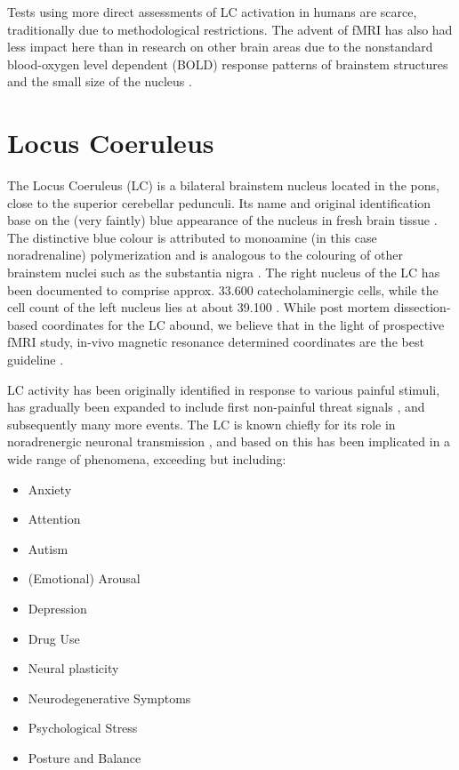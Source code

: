 	Tests using more direct assessments of LC activation in humans are scarce, traditionally due to methodological restrictions.
	The advent of fMRI has also had less impact here than in research on other brain areas due to the nonstandard blood-oxygen level dependent (BOLD) response patterns of brainstem structures and the small size of the nucleus \cite{Astafiev2010}.
	
    \section{Locus Coeruleus}\label{sec:b_lc}
	The Locus Coeruleus (LC) is a bilateral brainstem nucleus located in the pons, close to the superior cerebellar pedunculi.
	Its name and original identification base on the (very faintly) blue appearance of the nucleus in fresh brain tissue \cite{Maeda2000}.
	The distinctive blue colour is attributed to monoamine (in this case noradrenaline) polymerization and is analogous to the colouring of other brainstem nuclei such as the substantia nigra \cite{Mai2011}.
	The right nucleus of the LC has been documented to comprise approx. 33.600 catecholaminergic cells, while the cell count of the left nucleus lies at about 39.100 \cite{Mouton1994}.
	While post mortem dissection-based coordinates for the LC abound, we believe that in the light of prospective fMRI study, in-vivo magnetic resonance determined coordinates are the best guideline \cite{Keren2009}.
	
	LC activity has been originally identified in response to various painful stimuli, has gradually been expanded to include first non-painful threat signals \cite{Grant1984}, and subsequently many more events.
	The LC is known chiefly for its role in noradrenergic neuronal transmission \cite{Benarroch2009}, and based on this has been implicated in a wide range of phenomena, exceeding but including:
	\begin{multicols}{2}
	    \begin{itemize}
		\item Anxiety \cite{Weiss1994}
		\item Attention \cite{Benarroch2009}
		\item Autism \cite{Mehler2009}
		\item (Emotional) Arousal \cite{Bangasser2011,Benarroch2009}
		\item Depression \cite{Bangasser2011, Weiss1994}
		\item Drug Use \cite{Samuels2008}
		\item Neural plasticity \cite{Benarroch2009}
		\item Neurodegenerative Symptoms \cite{Samuels2008,Gesi2000}
		\item Psychological Stress \cite{Bangasser2011,Benarroch2009}
		\item Posture and Balance \cite{Benarroch2009}
	    \end{itemize}
	\end{multicols}
	
